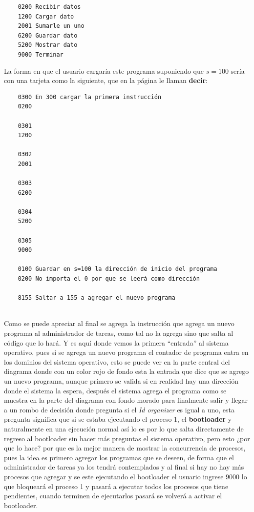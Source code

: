 \documentclass[12pt]{article}
\begin{document}
   \begin{verbatim}
   	0200 Recibir datos
   	1200 Cargar dato
   	2001 Sumarle un uno
   	6200 Guardar dato
   	5200 Mostrar dato
   	9000 Terminar
   \end{verbatim}
   
   La forma en que el usuario cargaría este programa suponiendo que $s=100$
   sería con una tarjeta como la siguiente, que en la página le llaman \textbf{decir}:
   
   \begin{verbatim}
   	0300 En 300 cargar la primera instrucción
   	0200
   	
   	0301
   	1200
   	
   	0302
   	2001
   	
   	0303
   	6200
   	
   	0304
   	5200
   	
   	0305
   	9000
   	
   	0100 Guardar en s=100 la dirección de inicio del programa
   	0200 No importa el 0 por que se leerá como dirección
   	
   	8155 Saltar a 155 a agregar el nuevo programa
   	
   \end{verbatim}
   
   Como se puede apreciar al final se agrega la instrucción que agrega un nuevo programa al administrador de tareas, como tal
   no la agrega sino que salta al código que lo hará. Y es aquí donde vemos la primera ``entrada'' al sistema operativo,
   pues si se agrega un nuevo programa el contador de programa entra en los dominios del sistema operativo, esto se puede
   ver en la parte central del diagrama donde con un color rojo de fondo esta la entrada que dice que se agrego
   un nuevo programa, aunque primero se valida si en realidad hay una dirección donde el sistema la espera, después el sistema
   agrega el programa como se muestra en la parte del diagrama con fondo morado para finalmente salir y llegar 
   a un rombo de decisión donde pregunta si el \textit{Id organizer} es igual a uno, esta pregunta significa que
   si se estaba ejecutando el proceso 1, el \textbf{bootloader} y naturalmente en una ejecución normal así lo es
   por lo que salta directamente de regreso al bootloader sin hacer más preguntas el sistema operativo, pero esto ¿por que
   lo hace? por que es la mejor manera de mostrar la concurrencia de procesos, pues la idea es primero agregar
   los programas que se deseen, de forma que el administrador de tareas ya los tendrá contemplados y al final
   si hay no hay más procesos que agregar y se este ejecutando el bootloader el usuario ingrese $9000$ lo que
   bloqueará el proceso 1 y pasará a ejecutar todos los procesos que tiene pendientes, cuando terminen de ejecutarlos
   pasará se volverá a activar el bootloader.
   
\end{document}
